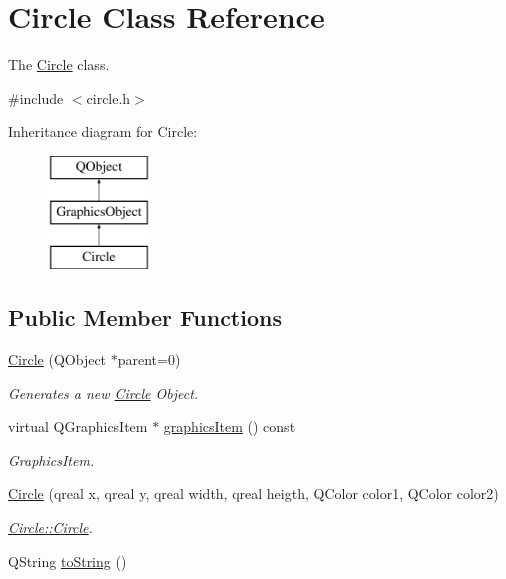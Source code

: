 \hypertarget{class_circle}{}\section{Circle Class Reference}
\label{class_circle}


The \hyperlink{class_circle}{Circle} class.  




{\ttfamily \#include $<$circle.\+h$>$}

Inheritance diagram for Circle\+:\begin{figure}[H]
\begin{center}
\leavevmode
\includegraphics[height=3.000000cm]{class_circle}
\end{center}
\end{figure}
\subsection*{Public Member Functions}
\begin{DoxyCompactItemize}
\item 
\hyperlink{class_circle_a4dca54ed7e68a3cd4b4836deaa5ecea1}{Circle} (Q\+Object $\ast$parent=0)
\begin{DoxyCompactList}\small\item\em Generates a new \hyperlink{class_circle}{Circle} Object. \end{DoxyCompactList}\item 
virtual Q\+Graphics\+Item $\ast$ \hyperlink{class_circle_ad1fa0a922709e61b3e70eef604a3600d}{graphics\+Item} () const
\begin{DoxyCompactList}\small\item\em Graphics\+Item. \end{DoxyCompactList}\item 
\hyperlink{class_circle_a6c99dec4ddc0c9c289d4beaf2c4f9a9e}{Circle} (qreal x, qreal y, qreal width, qreal heigth, Q\+Color color1, Q\+Color color2)
\begin{DoxyCompactList}\small\item\em \hyperlink{class_circle_a4dca54ed7e68a3cd4b4836deaa5ecea1}{Circle\+::\+Circle}. \end{DoxyCompactList}\item 
Q\+String \hyperlink{class_circle_a2fea55f4310daa23eb8c103bdcdcabd6}{to\+String} ()
\end{DoxyCompactItemize}


